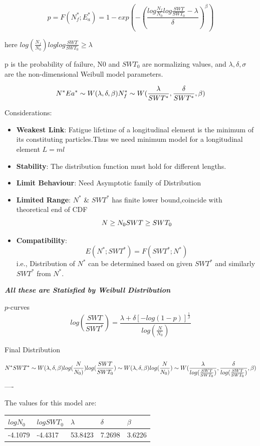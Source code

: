 \documentclass[11pt]{article}
\begin{document}
\[
p = F(N^*_f;E^*_a) = 1 - exp(-(\frac{log\frac{N_f}{N_0}log\frac{SWT}{SWT_0}-\lambda}{\delta})^\beta)
\]

here \(log(\frac{N_f}{N_0})loglog\frac{SWT}{SWT_0} \geq \lambda\)

p is the probability of failure, N0 and \(SWT_0\) are normalizing
values, and \(\lambda,\delta,\sigma\) are the non-dimensional Weibull
model parameters.

\[
N^*Ea^* \sim W(\lambda,\delta,\beta) \\
N^*_f\sim W(\frac{\lambda}{SWT^* },\frac{\delta}{SWT^* },\beta) \\
\]

Considerations:

\begin{itemize}
\item
  \textbf{Weakest Link}: Fatigue lifetime of a longitudinal element is
  the minimum of its constituting particles.Thus we need minimum model
  for a longitudinal element \(L = ml\)
\item
  \textbf{Stability}: The distribution function must hold for different
  lengths.
\item
  \textbf{Limit Behaviour}: Need Asymptotic family of Distribution
\item
  \textbf{Limited Range}: \(N^*\) \& \(SWT^*\) has finite lower
  bound,coincide with theoretical end of CDF \[
  N\geq N_0 \\
  SWT \geq SWT_0 
  \]
\item
  \textbf{Compatibility}: \[E(N^*;SWT^*) = F(SWT^*;N^*)\] i.e.,
  Distribution of \(N^*\) can be determined based on given \(SWT^*\) and
  similarly \(SWT^*\) from \(N^*\).
\end{itemize}

\textbf{\emph{All these are Statisfied by Weibull Distribution}}

\(p\)-curves \[
log(\frac{SWT}{SWT^*}) = \frac{\lambda + \delta[-log(1-p)]^{\frac{1}{\beta}}}{log(\frac{N}{N_0})}
\]

Final Distribution

\[
N^*SWT^* \sim W(\lambda,\delta,\beta) \\
log(\frac{N}{N_0)})log(\frac{SWT}{SWT_0}) \sim W(\lambda,\delta,\beta) \\
log(\frac{N}{N_0)})\sim W(\frac{\lambda}{log(\frac{SWT}{SWT_0}) },\frac{\delta}{log(\frac{SWT}{SWT_0}) },\beta) 
\] ----

The values for this model are:

\begin{longtable}[]{@{}lllll@{}}
\toprule
\(logN_0\) & \(logSWT_0\) & \(\lambda\) & \(\delta\) &
\(\beta\)\tabularnewline
\midrule
\endhead
-4.1079 & -4.4317 & 53.8423 & 7.2698 & 3.6226\tabularnewline
\bottomrule
\end{longtable}
\end{document}
